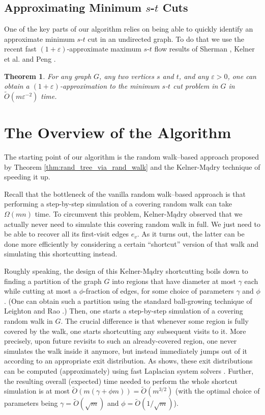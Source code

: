 \documentclass[11pt, letterpaper]{article}
\newtheorem{theorem}{Theorem}[section]
\newcommand{\tO}{\widetilde{O}}
\begin{document}
\subsection{Approximating Minimum $s$-$t$ Cuts} \label{sec:approximating_minimum_cuts}

One of the key parts of our algorithm relies on being able to quickly identify an approximate minimum $s$-$t$ cut in an undirected graph. To do that we use the recent fast $(1+\varepsilon)$-approximate maximum $s$-$t$ flow results of Sherman \cite{Sherman13}, Kelner et al. \cite{KelnerLOS14} and Peng \cite{Peng14}.



\begin{theorem}
For any graph $G$, any two vertices $s$ and $t$, and any $\varepsilon>0$, one can obtain a $(1+\varepsilon)$-approximation to the minimum $s$-$t$ cut problem in $G$ in $\tO(m\varepsilon^{-2})$ time.
\end{theorem}

 \section{The Overview of the Algorithm} \label{sec:overview}

The starting point of our algorithm is the random walk--based approach proposed by Theorem \ref{thm:rand_tree_via_rand_walk} and the Kelner-Mądry technique \cite{KelnerM09} of speeding it up. 

Recall that the bottleneck of the vanilla random walk--based approach is that performing a step-by-step simulation of a covering random walk can take $\Omega(mn)$ time. To circumvent this problem,  Kelner-Mądry observed that we actually never need to simulate this covering random walk in full. We just need to be able to recover all its first-visit edges $e_v$. As it turns out, the latter can be done more efficiently by considering a certain ``shortcut'' version of that walk and simulating this shortcutting instead.

Roughly speaking, the design of this Kelner-Mądry shortcutting boils down to finding a partition of the graph $G$ into regions that have diameter at most $\gamma$ each while cutting at most a $\phi$-fraction of edges, for some choice of parameters $\gamma$ and $\phi$. (One can obtain such a partition using the standard ball-growing technique of Leighton and Rao \cite{LeightonR99}.) Then, one starts a step-by-step simulation of a covering random walk in $G$. The crucial difference is that whenever some region is fully covered by the walk, one starts shortcutting any subsequent visits to it. More precisely, upon future revisits to such an already-covered region, one never simulates the walk inside it anymore, but instead immediately jumps out of it according to an appropriate exit distribution. As \cite{KelnerM09} shows, these exit distributions can be computed (approximately) using fast Laplacian system solvers \cite{SpielmanT03,SpielmanT04,KoutisMP10,KoutisMP11,KelnerOSZ13}. Further, the resulting overall (expected) time needed to perform the whole shortcut simulation is at most $\tO(m(\gamma + \phi m))=\tO(m^{3/2})$ (with the optimal choice of parameters being $\gamma=\tO(\sqrt{m})$ and $\phi=\tO(1/\sqrt{m})$).
\end{document}
